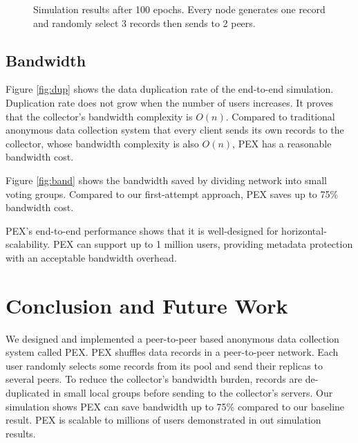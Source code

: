 \documentclass[twocolumn]{article}
\begin{document}
\begin{figure}[t]
\centering
{}
\caption{Simulation results after 100 epochs. Every node generates one record and randomly select 3 records then sends to 2 peers.}
\label{fig:scala}
\end{figure}

\subsection{Bandwidth}
Figure \ref{fig:dup} shows the data duplication rate of the end-to-end simulation. Duplication rate does not grow when the number of users increases. It proves that the collector's bandwidth complexity is $O(n)$. Compared to traditional anonymous data collection system that every client sends its own records to the collector, whose bandwidth complexity is also $O(n)$, PEX has a reasonable bandwidth cost.

Figure \ref{fig:band} shows the bandwidth saved by dividing network into small voting groups. Compared to our first-attempt approach, PEX saves up to 75\% bandwidth cost.

PEX's end-to-end performance shows that it is well-designed for horizontal-scalability. PEX can support up to 1 million users, providing metadata protection with an acceptable bandwidth overhead.

\section{Conclusion and Future Work}
We designed and implemented a peer-to-peer based anonymous data collection system called PEX. PEX shuffles data records in a peer-to-peer network. Each user randomly selects some records from its pool and send their replicas to several peers. To reduce the collector's bandwidth burden, records are de-duplicated in small local groups before sending to the collector's servers. Our simulation shows PEX can save bandwidth up to 75\% compared to our baseline result. PEX is scalable to millions of users demonstrated in out simulation results.
\end{document}

